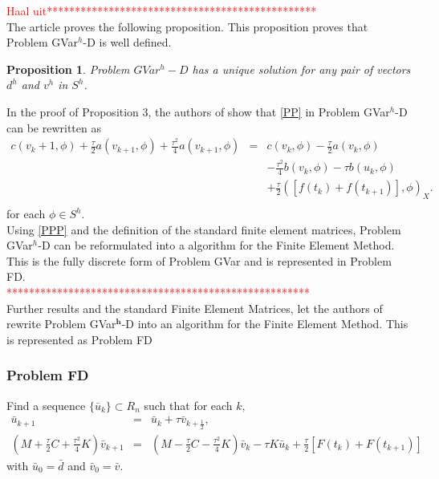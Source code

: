 \documentclass[../../main.tex]{subfiles}
\begin{document}
\textcolor{red}{Haal uit************************************************}\\
The article \cite{BV13} proves the following proposition. This proposition proves that Problem GVar$^h$-D is well defined.

\newtheorem{DC_Prop4}[DC_Prop2]{Proposition}
\begin{DC_Prop4}
	Problem $GVar^{h}-D$ has a unique solution for any pair of vectors $d^{h}$ and $v^{h}$ in $S^{h}$.
\end{DC_Prop4}

In the proof of Proposition 3, the authors of \cite{BV13} show that \eqref{PP} in Problem GVar$^h$-D can be rewritten as
\begin{eqnarray}
	c(v_k+1,\phi) + \frac{\tau}{2} a(v_{k+1},\phi) + \frac{\tau^2}{4} a(v_{k+1},\phi) & = & c(v_k,\phi) - \frac{\tau}{2} a(v_k,\phi) \nonumber \\  &&
	 - \frac{\tau^2}{4}b(v_k,\phi) - \tau b(u_k,\phi) \nonumber\\
	 &&+\frac{\tau}{2}([f(t_k)+f(t_{k+1})],\phi)_X.\nonumber \\ \label{PPP}
\end{eqnarray} for each $\phi \in S^h$.\\

Using \eqref{PPP} and the definition of the standard finite element matrices, Problem GVar$^h$-D can be reformulated into a algorithm for the Finite Element Method. This is the fully discrete form of Problem GVar and is represented in Problem FD.\\
\textcolor{red}{******************************************************}\\

Further results and the standard Finite Element Matrices, let the authors of \cite{BV13} rewrite Problem GVar$^\mathbf{{h}}$-D into an algorithm for the Finite Element Method. This is represented as Problem FD

\subsubsection*{Problem FD}
Find a sequence $\{\bar{u}_{k}\}\subset R_{n}$ such that for each $k,$
\begin{eqnarray*}
	\bar{u}_{k+1}\ & = & \bar{u}_{k}+\tau\bar{v}_{k+\frac{1}{2}},\\
	(M + \frac{\tau}{2}C+\frac{\tau^{2}}{4}K)\bar{v}_{k+1} & = & (M- \frac{\tau}{2}C-\frac{\tau^{2}}{4}K)\bar{v}_{k}-\tau K\bar{u}_{k}+\frac{\tau}{2}[F(t_{k})+F(t_{k+1})]
\end{eqnarray*}
with $\bar{u}_{0}=\bar{d}$ and $\bar{v}_{0}=\bar{v}.$\\
\end{document}
